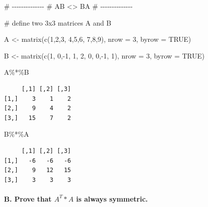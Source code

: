 \documentclass[
  letterpaper,
  DIV=11,
  numbers=noendperiod]{scrartcl}
\let\oldparagraph\paragraph
\renewcommand{\paragraph}[1]{\oldparagraph{#1}\mbox{}}
\newenvironment{Shaded}{\begin{snugshade}}{\end{snugshade}}
\newcommand{\AttributeTok}[1]{\textcolor[rgb]{0.40,0.45,0.13}{#1}}
\newcommand{\CommentTok}[1]{\textcolor[rgb]{0.37,0.37,0.37}{#1}}
\newcommand{\ConstantTok}[1]{\textcolor[rgb]{0.56,0.35,0.01}{#1}}
\newcommand{\DecValTok}[1]{\textcolor[rgb]{0.68,0.00,0.00}{#1}}
\newcommand{\FunctionTok}[1]{\textcolor[rgb]{0.28,0.35,0.67}{#1}}
\newcommand{\NormalTok}[1]{\textcolor[rgb]{0.00,0.23,0.31}{#1}}
\newcommand{\OtherTok}[1]{\textcolor[rgb]{0.00,0.23,0.31}{#1}}
\newcommand{\SpecialCharTok}[1]{\textcolor[rgb]{0.37,0.37,0.37}{#1}}
\begin{document}
\begin{Shaded}
\begin{Highlighting}[]
\CommentTok{\# {-}{-}{-}{-}{-}{-}{-}{-}{-}{-}{-}{-}{-}{-}}
\CommentTok{\# AB \textless{}\textgreater{} BA}
\CommentTok{\# {-}{-}{-}{-}{-}{-}{-}{-}{-}{-}{-}{-}{-}{-}}

\CommentTok{\# define two 3x3 matrices A and B}

\NormalTok{A }\OtherTok{\textless{}{-}} \FunctionTok{matrix}\NormalTok{(}\FunctionTok{c}\NormalTok{(}\DecValTok{1}\NormalTok{,}\DecValTok{2}\NormalTok{,}\DecValTok{3}\NormalTok{,}
              \DecValTok{4}\NormalTok{,}\DecValTok{5}\NormalTok{,}\DecValTok{6}\NormalTok{,}
              \DecValTok{7}\NormalTok{,}\DecValTok{8}\NormalTok{,}\DecValTok{9}\NormalTok{),}
            \AttributeTok{nrow =} \DecValTok{3}\NormalTok{, }\AttributeTok{byrow =} \ConstantTok{TRUE}\NormalTok{)}

\NormalTok{B }\OtherTok{\textless{}{-}} \FunctionTok{matrix}\NormalTok{(}\FunctionTok{c}\NormalTok{(}\DecValTok{1}\NormalTok{, }\DecValTok{0}\NormalTok{,}\SpecialCharTok{{-}}\DecValTok{1}\NormalTok{,}
              \DecValTok{1}\NormalTok{, }\DecValTok{2}\NormalTok{, }\DecValTok{0}\NormalTok{,}
              \DecValTok{0}\NormalTok{,}\SpecialCharTok{{-}}\DecValTok{1}\NormalTok{, }\DecValTok{1}\NormalTok{),}
            \AttributeTok{nrow =} \DecValTok{3}\NormalTok{, }\AttributeTok{byrow =} \ConstantTok{TRUE}\NormalTok{)}

\NormalTok{A}\SpecialCharTok{\%*\%}\NormalTok{B}
\end{Highlighting}
\end{Shaded}

\begin{verbatim}
     [,1] [,2] [,3]
[1,]    3    1    2
[2,]    9    4    2
[3,]   15    7    2
\end{verbatim}

\begin{Shaded}
\begin{Highlighting}[]
\NormalTok{B}\SpecialCharTok{\%*\%}\NormalTok{A}
\end{Highlighting}
\end{Shaded}

\begin{verbatim}
     [,1] [,2] [,3]
[1,]   -6   -6   -6
[2,]    9   12   15
[3,]    3    3    3
\end{verbatim}

\paragraph{\texorpdfstring{B. Prove that \(A^T*A\) is always
symmetric.}{B. Prove that A\^{}T*A is always symmetric.}}\label{b.-prove-that-ata-is-always-symmetric.}
\end{document}
